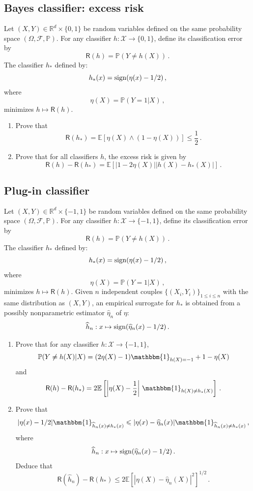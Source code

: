 \documentclass[a4paper,10pt,fleqn]{article}
\newcommand{\eqsp}{\,}
\newcommand{\calF}{\mathcal{F}}
\newcommand{\rset}{\ensuremath{\mathbb{R}}}
\newcommand{\bP}{\mathbb{P}}
\newcommand{\1}{\ensuremath{\mathbbm{1}}}
\newcommand{\bE}{\mathbb{E}}
\begin{document}
\subsection{Bayes classifier: excess risk}
Let $(X,Y)\in\rset^d\times\{0,1\}$ be random variables defined on the same probability space $(\Omega,\calF,\bP)$.
For any classifier $h:\mathcal{X}\to \{0,1\}$, define its classification error by
$$
\mathsf{R}(h)=\bP(Y\neq h(X))\eqsp.
$$
The classifier $h_*$ defined by:
$$
h_{*}(x)={\rm sign}(\eta(x)-1/2)\eqsp,
$$
where
$$
\eta(X) = \bP(Y=1|X)\eqsp,
$$
minimizes $h\mapsto \mathsf{R}(h)$.
\begin{enumerate}
\item Prove that 
$$
\mathsf{R}(h_*) = \mathbb{E}\left[\eta(X) \wedge (1-\eta(X))\right]\leqslant \frac{1}{2}\eqsp.
$$
\item Prove that for all classifiers $h$, the excess risk is given by
$$
\mathsf{R}(h)  - \mathsf{R}(h_*) = \mathbb{E}\left[\left|1-2\eta(X)\right|\left|h(X) - h_*(X)\right|\right]\eqsp.
$$
\end{enumerate}



\subsection{Plug-in classifier}
Let $(X,Y)\in\rset^d\times\{-1,1\}$ be random variables defined on the same probability space $(\Omega,\calF,\bP)$.
For any classifier $h:\mathcal{X}\to \{-1,1\}$, define its classification error by
$$
\mathsf{R}(h)=\bP(Y\neq h(X))\eqsp.
$$
The classifier $h_*$ defined by:
$$
h_{*}(x)={\rm sign}(\eta(x)-1/2)\eqsp,
$$
where
$$
\eta(X) = \bP(Y=1|X)\eqsp,
$$
minimizes $h\mapsto \mathsf{R}(h)$. Given $n$ independent couples $\{(X_i,Y_i)\}_{1\leqslant i \leqslant n}$ with the same distribution as $(X,Y)$, an empirical surrogate for $h_{*}$ is obtained from a possibly nonparametric estimator $\widehat \eta_n$ of $\eta$:
$$
\widehat h_n: x\mapsto {\rm sign}(\widehat \eta_n(x)-1/2)\eqsp.
$$
\begin{enumerate}
\item Prove that for any classifier $h:\mathcal{X}\to \{-1,1\}$,
$$
\bP(Y\neq h(X)|X) = (2\eta(X)-1)\1_{h(X)=-1}+1-\eta(X)
$$
and
$$
\mathsf{R}(h)-\mathsf{R}(h_{*})=2\bE \left[\left|\eta(X)-\frac{1}{2}\right|\eqsp\1_{h(X)\neq h_*(X)}\right]\eqsp.
$$
\item Prove that 
$$
|\eta(x)-1/2|\1_{\widehat h_n(x)\neq h_{*}(x)}\leqslant |\eta(x)-\widehat \eta_n(x)|\1_{\widehat h_n(x)\neq h_{*}(x)}\eqsp,
$$
where
$$
\widehat h_n:x \mapsto{\rm sign}(\widehat \eta_n(x)-1/2)\eqsp.
$$
Deduce that 
$$
\mathsf{R}(\widehat h_n)-\mathsf{R}(h_*)\leqslant  2 \bE[|\eta(X) - \widehat \eta_n(X)|^2]^{1/2}\eqsp.
$$
\end{enumerate}
\end{document}

